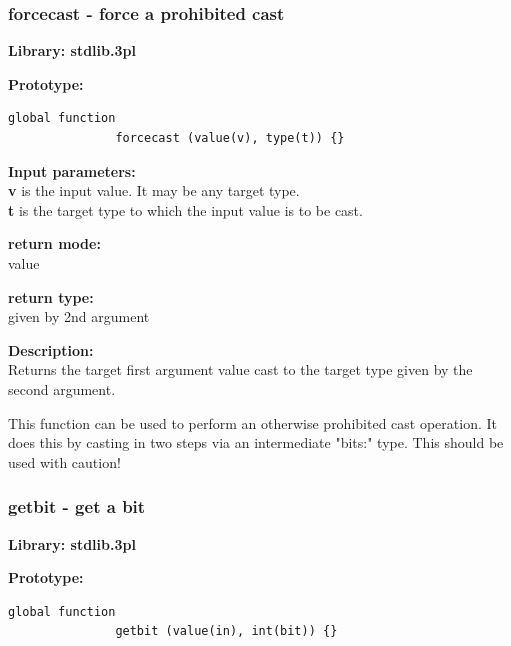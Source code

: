         \subsubsection{forcecast - force a prohibited cast}\label{sec:lfforcecast}

            {\bf Library: stdlib.3pl}

            {\bf Prototype:} \\
            \vsp
            \begin{lstlisting}[gobble=12, language=threepl]
               global function
               forcecast (value(v), type(t)) {}
             \end{lstlisting}

            {\bf Input parameters:} \\            
            {\bf v} is the input value. It may be any target type.\\
            {\bf t} is the target type to which the input value is to be cast.

            {\bf return mode:} \\
            value

            {\bf return type:} \\
            given by 2nd argument

            {\bf Description:} \\
            Returns the target first argument value cast to the target type
            given by the second argument.
            
            This function can be used to perform an otherwise prohibited
            cast operation. It does this by casting in two steps via an
            intermediate "bits:" type. This should be used with caution!




        \subsubsection{getbit - get a bit}\label{sec:lfgetbit}

            {\bf Library: stdlib.3pl}

            {\bf Prototype:} \\
            \vsp
            \begin{lstlisting}[gobble=12, language=threepl]
               global function
               getbit (value(in), int(bit)) {}
            \end{lstlisting}

